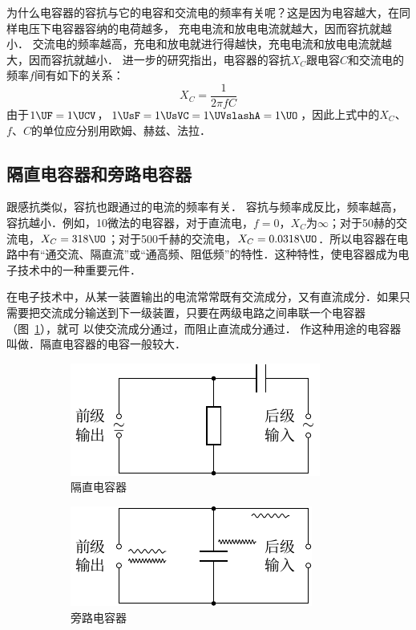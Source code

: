 为什么电容器的容抗与它的电容和交流电的频率有关呢？这是因为电容越大，在同样电压下电容器容纳的电荷越多，
充电电流和放电电流就越大，因而容抗就越小．
交流电的频率越高，充电和放电就进行得越快，充电电流和放电电流就越大，因而容抗就越小．
进一步的研究指出，电容器的容抗$X_C$跟电容$C$和交流电的频率$f$间有如下的关系：
\[X_C=\frac{1}{2\pi fC} \]
由于$1\UF=1\UCV$，$1 \UsF =1 \UsVC =1 \UVslashA =1\UO $，因此上式中的$X_C$、$f$、$C$的单位应分别用欧姆、赫兹、法拉．

\subsection{隔直电容器和旁路电容器}

跟感抗类似，容抗也跟通过的电流的频率有关．
容抗与频率成反比，频率越高，容抗越小．例如，10微法的电容器，对于直流电，$f=0$，$X_C$为$\infty$；对于50赫的交流电，$X_C=318\UO$；对于500千赫的交流电，$X_C=0.0318\UO$．所以电容器在电路中有“通交流、隔直流”或“通高频、阻低频”的特性．这种特性，使电容器成为电子技术中的一种重要元件．

在电子技术中，从某一装置输出的电流常常既有交流成分，又有直流成分．如果只需要把交流成分输送到下一级装置，只要在两级电路之间串联一个电容器（图~\ref{fig_C_3-19a}），就可
以使交流成分通过，而阻止直流成分通过．
作这种用途的电容器叫做．隔直电容器的电容一般较大．
\begin{figure}[htbp]
    \centering
    \begin{subfigure}{0.4\linewidth}
        \centering
        \includegraphics{fig/C/3-19a.pdf}
        \caption{隔直电容器}\label{fig_C_3-19a}
    \end{subfigure}
    \hfil
    \begin{subfigure}{0.4\linewidth}
        \centering
        \includegraphics{fig/C/3-19b.pdf}
        \caption{旁路电容器}\label{fig_C_3-19b}
    \end{subfigure}
    \caption{}\label{fig_C_3-19}
\end{figure}

